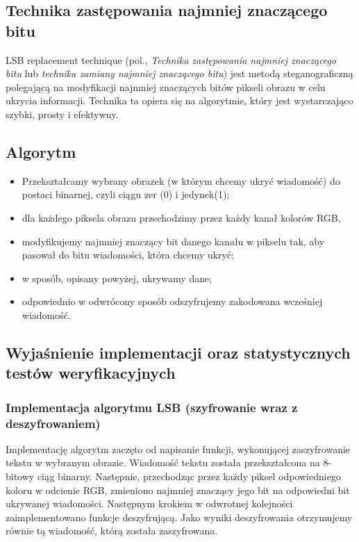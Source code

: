 \subsection{Technika zastępowania najmniej znaczącego bitu}
LSB replacement technique (pol., \textit{Technika zastępowania najmniej znaczącego bitu} lub \textit{technika zamiany najmniej znaczącego bitu}) jest metodą steganograficzną polegającą na modyfikacji najmniej znaczących bitów pikseli obrazu w celu ukrycia informacji. Technika ta opiera się na algorytmie, który jest wystarczająco szybki, prosty i efektywny.

\subsection{Algorytm}
\begin{itemize}
    \item Przekształcamy wybrany obrazek (w którym chcemy ukryć wiadomość) do postaci binarnej, czyli ciągu zer (0) i jedynek(1);
    \item dla każdego piksela obrazu przechodzimy przez każdy kanał kolorów RGB,
    \item modyfikujemy najmniej znaczący bit danego kanału w pikselu tak, aby pasował do bitu wiadomości, która chcemy ukryć;
    \item w sposób, opisany powyżej, ukrywamy dane;
    \item odpowiednio w odwrócony sposób odszyfrujemy zakodowana wcześniej wiadomość.
\end{itemize}

\subsection{Wyjaśnienie implementacji oraz statystycznych testów weryfikacyjnych}

\subsubsection{Implementacja algorytmu LSB (szyfrowanie wraz z deszyfrowaniem)}

Implementację algorytm zaczęto od napisanie funkcji, wykonującej zaszyfrowanie tekstu w wybranym obrazie. Wiadomość tekstu została przekształcona na 8-bitowy ciąg binarny. Następnie, przechodząc przez każdy piksel odpowiedniego koloru w odcienie RGB, zmieniono najmniej znaczący jego bit na odpowiedni bit ukrywanej wiadomości.
Następnym krokiem w odwrotnej kolejności zaimplementowano funkcje deszyfrującą. Jako wyniki deszyfrowania otrzymujemy równie tą wiadomość, którą została zaszyfrowana.

